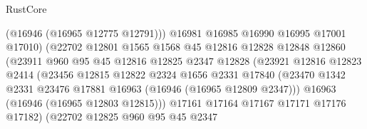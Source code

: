\begin{lexlean}{RustCore}
\begin{coremodule}
                                      (@16946 (@16965 @12775 @12791)))
                                    @16981
                                    @16985
                                    @16990
                                    @16995
                                    @17001
                                    @17010)
                                  (@22702
                                    @12801
                                    @1565
                                    @1568
                                    @45
                                    @12816
                                    @12828
                                    @12848
                                    @12860
                                    (@23911
                                      @960
                                      @95
                                      @45
                                      @12816
                                      @12825
                                      @2347
                                      @12828
                                      (@23921
                                        @12816
                                        @12823
                                        @2414
                                        (@23456
                                          @12815
                                          @12822
                                          @2324
                                          @1656
                                          @2331
                                          @17840
                                          (@23470
                                            @1342
                                            @2331
                                            @23476
                                            @17881
                                            @16963
                                            (@16946 (@16965 @12809 @2347)))
                                          @16963
                                          (@16946 (@16965 @12803 @12815)))
                                        @17161
                                        @17164
                                        @17167
                                        @17171
                                        @17176
                                        @17182)
                                      (@22702
                                        @12825
                                        @960
                                        @95
                                        @45
                                        @2347

\end{coremodule}
\end{lexlean}

